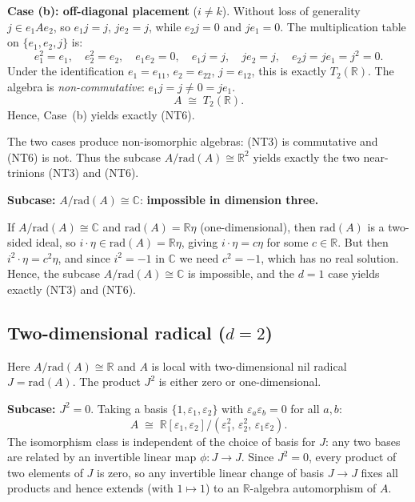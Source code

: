 \documentclass{amsart}
\theoremstyle{plain}
\theoremstyle{definition}
\theoremstyle{remark}
\newcommand{\RR}{\mathbb{R}}
\newcommand{\CC}{\mathbb{C}}
\newcommand{\Jac}{\mathrm{rad}}
\begin{document}
\medskip
\noindent\textbf{Case (b): off-diagonal placement} ($i \neq k$).
Without loss of generality $j \in e_1 A e_2$, so
$e_1 j = j$, $j e_2 = j$, while $e_2 j = 0$ and $j e_1 = 0$.
The multiplication table on $\{e_1, e_2, j\}$ is:
\[
  e_1^2 = e_1,\quad e_2^2 = e_2,\quad e_1 e_2 = 0,\quad
  e_1 j = j,\quad j e_2 = j,\quad
  e_2 j = j e_1 = j^2 = 0.
\]
Under the identification $e_1 = e_{11}$, $e_2 = e_{22}$, $j = e_{12}$,
this is exactly $T_2(\RR)$.
The algebra is \emph{non-commutative}: $e_1 j = j \neq 0 = j e_1$.
\[
  \boxed{A \;\cong\; T_2(\RR). \tag{NT6}}
\]
Hence, Case~(b) yields exactly \textup{(NT6)}.

The two cases produce non-isomorphic algebras: (NT3) is commutative and
(NT6) is not.
Thus the subcase $A/\Jac(A) \cong \RR^2$ yields exactly the two near-trinions
(NT3) and (NT6).

\medskip
\noindent\textbf{Subcase:} $A/\Jac(A) \cong \CC$: \textbf{impossible in dimension three.}

If $A/\Jac(A) \cong \CC$ and $\Jac(A) = \RR\eta$ (one-dimensional), then
$\Jac(A)$ is a two-sided ideal, so $i \cdot \eta \in \Jac(A) = \RR\eta$,
giving $i \cdot \eta = c\eta$ for some $c \in \RR$.
But then $i^2 \cdot \eta = c^2\eta$, and since $i^2 = -1$ in $\CC$ we
need $c^2 = -1$, which has no real solution.
Hence, the subcase $A/\Jac(A) \cong \CC$ is impossible, and the $d = 1$
case yields exactly (NT3) and (NT6).

\subsection{Two-dimensional radical (\texorpdfstring{$d=2$}{d=2})}

Here $A/\Jac(A) \cong \RR$ and $A$ is local with two-dimensional nil
radical $J = \Jac(A)$.
The product $J^2$ is either zero or one-dimensional.

\medskip
\noindent\textbf{Subcase:} $J^2 = 0$.
Taking a basis $\{1, \varepsilon_1, \varepsilon_2\}$ with $\varepsilon_a \varepsilon_b = 0$ for all $a, b$:
\[
  \boxed{A \;\cong\;
  \RR[\varepsilon_1, \varepsilon_2]\big/(\varepsilon_1^2,\, \varepsilon_2^2,\, \varepsilon_1 \varepsilon_2). \tag{NT4}}
\]
The isomorphism class is independent of the choice of basis for $J$:
any two bases are related by an invertible linear map $\phi\colon J\to J$.
Since $J^2=0$, every product of two elements of $J$ is zero, so any invertible
linear change of basis $J\to J$ fixes all products and hence extends (with
$1\mapsto 1$) to an $\RR$-algebra automorphism of $A$.
\end{document}
